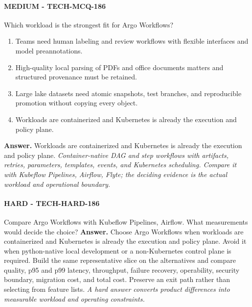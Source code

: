 \paragraph{MEDIUM - TECH-MCQ-186} Which workload is the strongest fit for Argo Workflows?
\begin{enumerate}[label=\Alph*.]
\item Teams need human labeling and review workflows with flexible interfaces and model preannotations.
\item High-quality local parsing of PDFs and office documents matters and structured provenance must be retained.
\item Large lake datasets need atomic snapshots, test branches, and reproducible promotion without copying every object.
\item Workloads are containerized and Kubernetes is already the execution and policy plane.
\end{enumerate}
\textbf{Answer.} Workloads are containerized and Kubernetes is already the execution and policy plane.
\textit{Container-native DAG and step workflows with artifacts, retries, parameters, templates, events, and Kubernetes scheduling. Compare it with Kubeflow Pipelines, Airflow, Flyte; the deciding evidence is the actual workload and operational boundary.}
\paragraph{HARD - TECH-HARD-186} Compare Argo Workflows with Kubeflow Pipelines, Airflow. What measurements would decide the choice?
\textbf{Answer.} Choose Argo Workflows when workloads are containerized and Kubernetes is already the execution and policy plane. Avoid it when python-native local development or a non-Kubernetes control plane is required. Build the same representative slice on the alternatives and compare quality, p95 and p99 latency, throughput, failure recovery, operability, security boundary, migration cost, and total cost. Preserve an exit path rather than selecting from feature lists.
\textit{A hard answer converts product differences into measurable workload and operating constraints.}

